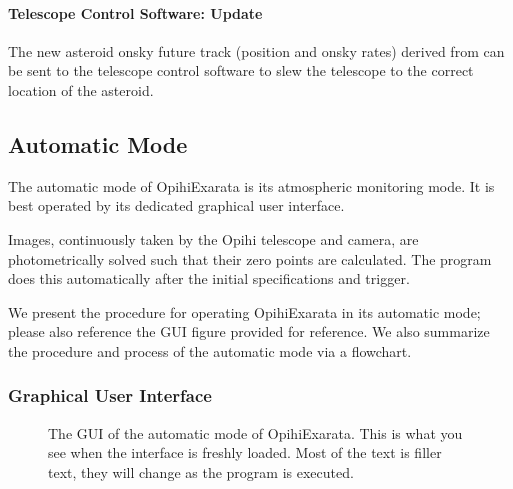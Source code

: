 \documentclass[letterpaper,11pt,english]{sphinxmanual}
\begin{document}
\paragraph{Telescope Control Software: Update}
\label{\detokenize{user/manual_mode:telescope-control-software-update}}
\sphinxAtStartPar
The new asteroid on\sphinxhyphen{}sky future track (position and on\sphinxhyphen{}sky rates) derived from
{\hyperref[\detokenize{user/manual_mode:user-manual-procedure-asteroid-on-sky-future-track}]{}} can be sent to the
telescope control software to slew the telescope to the correct location of
the asteroid.

\sphinxstepscope


\subsection{Automatic Mode}
\label{\detokenize{user/automatic_mode:automatic-mode}}\label{\detokenize{user/automatic_mode:user-automatic-mode}}\label{\detokenize{user/automatic_mode::doc}}
\sphinxAtStartPar
The automatic mode of OpihiExarata is its atmospheric monitoring mode. It is
best operated by its dedicated graphical user interface.

\sphinxAtStartPar
Images, continuously taken by the Opihi telescope and camera, are
photometrically solved such that their zero points are calculated. The
program does this automatically after the initial specifications and trigger.

\sphinxAtStartPar
We present the procedure for operating OpihiExarata in its automatic mode;
please also reference the GUI figure provided for reference. We also summarize
the procedure and process of the automatic mode via a flowchart.


\subsubsection{Graphical User Interface}
\label{\detokenize{user/automatic_mode:graphical-user-interface}}
\begin{figure}[H]
\centering
\capstart

\noindent{}
\caption{The GUI of the automatic mode of OpihiExarata. This is what you see when
the interface is freshly loaded. Most of the text is filler text, they will
change as the program is executed.}\label{\detokenize{user/automatic_mode:id1}}\label{\detokenize{user/automatic_mode:figure-automatic-mode-gui}}\end{figure}
\end{document}
